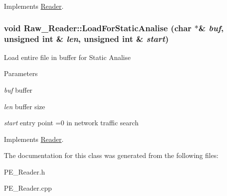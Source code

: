 Implements \hyperlink{classReader_a0fe4ac206880263e042c5277370c679b}{Reader}.

\hypertarget{classRaw__Reader_a135e1dd4eadb2afaf201002d5402f21e}{
\subsubsection[{LoadForStaticAnalise}]{\setlength{\rightskip}{0pt plus 5cm}void Raw\_\-Reader::LoadForStaticAnalise (char $\ast$\& {\em buf}, \/  unsigned int \& {\em len}, \/  unsigned int \& {\em start})}}
\label{classRaw__Reader_a135e1dd4eadb2afaf201002d5402f21e}
Load entire file in buffer for Static Analise 
\begin{DoxyParams}{Parameters}
\item[{\em buf}]buffer \item[{\em len}]buffer size \item[{\em start}]entry point =0 in network traffic search \end{DoxyParams}


Implements \hyperlink{classReader_a48b1d822c048d481388fe05ff90b10f3}{Reader}.



The documentation for this class was generated from the following files:\begin{DoxyCompactItemize}
\item 
PE\_\-Reader.h\item 
PE\_\-Reader.cpp\end{DoxyCompactItemize}
